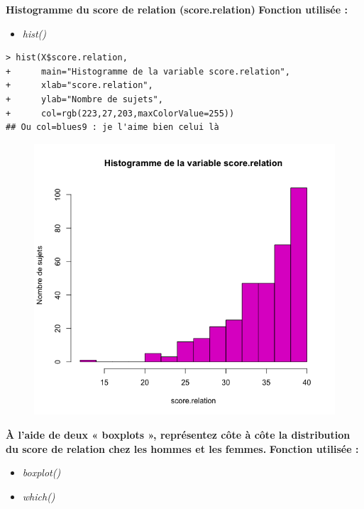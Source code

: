 \textbf{Histogramme du score de relation (score.relation)}\newline
\textbf{Fonction utilisée : }
\begin{itemize}
\item \textit{hist()}
\end{itemize}
\begin{lstlisting}[language=html]
> hist(X$score.relation, 
+      main="Histogramme de la variable score.relation",
+      xlab="score.relation",
+      ylab="Nombre de sujets",
+      col=rgb(223,27,203,maxColorValue=255))
## Ou col=blues9 : je l'aime bien celui là
\end{lstlisting}

\begin{figure}[H]\begin{center}\includegraphics[scale=0.5]{ilu/Dev11.png}\end{center}\end{figure}

\textbf{À l'aide de deux « boxplots », représentez côte à côte la distribution du score
de relation chez les hommes et les femmes.}\newline
\textbf{Fonction utilisée : }
\begin{itemize}
\item \textit{boxplot()}
\item \textit{which()}
\end{itemize}

